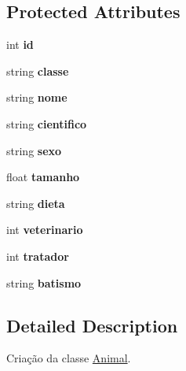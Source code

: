\subsection*{Protected Attributes}
\begin{DoxyCompactItemize}
\item 
\mbox{\label{class_animal_a0e1e797aa638af5d8276bcf12fad9a1f}} 
int {\bfseries id}
\item 
\mbox{\label{class_animal_ac18558124618675ac262369adcd6e2f5}} 
string {\bfseries classe}
\item 
\mbox{\label{class_animal_a54f3f22208c7342039266c8c87de99e7}} 
string {\bfseries nome}
\item 
\mbox{\label{class_animal_afb1c2c6e57afabb641cfac58307a54d7}} 
string {\bfseries cientifico}
\item 
\mbox{\label{class_animal_ae606d25f0901c7780603b5b15d0dc763}} 
string {\bfseries sexo}
\item 
\mbox{\label{class_animal_af164439fb6b2f4c470f451a8e7cbfd1e}} 
float {\bfseries tamanho}
\item 
\mbox{\label{class_animal_a1d9c10e256acf2b2dfdf5b57c135af54}} 
string {\bfseries dieta}
\item 
\mbox{\label{class_animal_af012f0c22d494aa3ebfb19e2d571b8b7}} 
int {\bfseries veterinario}
\item 
\mbox{\label{class_animal_adf6d91811fe24cbc75f253cce86393e0}} 
int {\bfseries tratador}
\item 
\mbox{\label{class_animal_aca7799bebd7ead41bca479831a57a2be}} 
string {\bfseries batismo}
\end{DoxyCompactItemize}


\subsection{Detailed Description}
Criação da classe \mbox{\hyperlink{class_animal}{Animal}}. 

